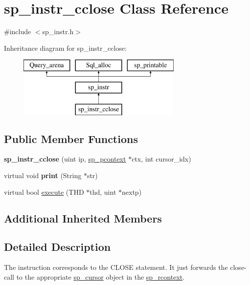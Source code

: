 \hypertarget{classsp__instr__cclose}{}\section{sp\+\_\+instr\+\_\+cclose Class Reference}
\label{classsp__instr__cclose}


{\ttfamily \#include $<$sp\+\_\+instr.\+h$>$}

Inheritance diagram for sp\+\_\+instr\+\_\+cclose\+:\begin{figure}[H]
\begin{center}
\leavevmode
\includegraphics[height=3.000000cm]{classsp__instr__cclose}
\end{center}
\end{figure}
\subsection*{Public Member Functions}
\begin{DoxyCompactItemize}
\item 
\mbox{\label{classsp__instr__cclose_a73a30be69bea07ea87834d095786e22e}} 
{\bfseries sp\+\_\+instr\+\_\+cclose} (uint ip, \mbox{\hyperlink{classsp__pcontext}{sp\+\_\+pcontext}} $\ast$ctx, int cursor\+\_\+idx)
\item 
\mbox{\label{classsp__instr__cclose_ac0a27fc7473240d98628071a1e7033bb}} 
virtual void {\bfseries print} (String $\ast$str)
\item 
virtual bool \mbox{\hyperlink{classsp__instr__cclose_abe0cc169c3f0e26238946c52eb686745}{execute}} (T\+HD $\ast$thd, uint $\ast$nextp)
\end{DoxyCompactItemize}
\subsection*{Additional Inherited Members}


\subsection{Detailed Description}
The instruction corresponds to the C\+L\+O\+SE statement. It just forwards the close-\/call to the appropriate \mbox{\hyperlink{classsp__cursor}{sp\+\_\+cursor}} object in the \mbox{\hyperlink{classsp__rcontext}{sp\+\_\+rcontext}}. 

